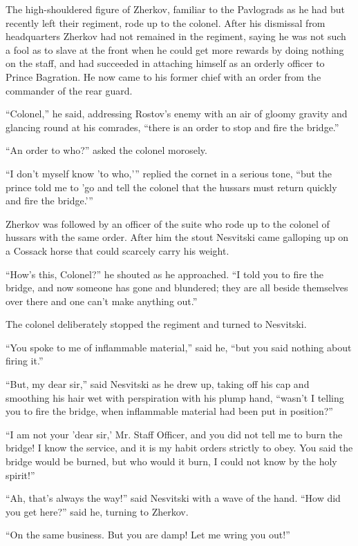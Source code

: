 The high-shouldered figure of Zherkov, familiar to the Pavlograds
as he had but recently left their regiment, rode up to the
colonel. After his dismissal from headquarters Zherkov had not
remained in the regiment, saying he was not such a fool as to
slave at the front when he could get more rewards by doing
nothing on the staff, and had succeeded in attaching himself as
an orderly officer to Prince Bagration. He now came to his former
chief with an order from the commander of the rear guard.

``Colonel,'' he said, addressing Rostov's enemy with an air of
gloomy gravity and glancing round at his comrades, ``there is an
order to stop and fire the bridge.''

``An order to who?'' asked the colonel morosely.

``I don't myself know 'to who,'{}'' replied the cornet in a
serious tone, ``but the prince told me to 'go and tell the
colonel that the hussars must return quickly and fire the
bridge.'{}''

Zherkov was followed by an officer of the suite who rode up to
the colonel of hussars with the same order. After him the stout
Nesvitski came galloping up on a Cossack horse that could
scarcely carry his weight.

``How's this, Colonel?'' he shouted as he approached. ``I told
you to fire the bridge, and now someone has gone and blundered;
they are all beside themselves over there and one can't make
anything out.''

The colonel deliberately stopped the regiment and turned to
Nesvitski.

``You spoke to me of inflammable material,'' said he, ``but you
said nothing about firing it.''

``But, my dear sir,'' said Nesvitski as he drew up, taking off
his cap and smoothing his hair wet with perspiration with his
plump hand, ``wasn't I telling you to fire the bridge, when
inflammable material had been put in position?''

``I am not your 'dear sir,' Mr. Staff Officer, and you did not
tell me to burn the bridge! I know the service, and it is my
habit orders strictly to obey. You said the bridge would be
burned, but who would it burn, I could not know by the holy
spirit!''

``Ah, that's always the way!'' said Nesvitski with a wave of the
hand.  ``How did you get here?'' said he, turning to Zherkov.

``On the same business. But you are damp! Let me wring you out!''

